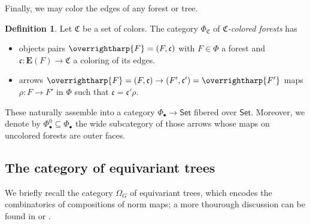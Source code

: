 \documentclass[a4paper,10pt
,draft
]{article}%
\numberwithin{equation}{section}
\numberwithin{figure}{section}
\theoremstyle{definition} %
\newtheorem{definition}[equation]{Definition}%
\newcommand{\vect}[1]{\text{\overrightharp{\ensuremath{#1}}}}
\newcommand{\Set}{\ensuremath{\mathsf{Set}}}
\newcommand{\1}{\ensuremath{\mathbbm 1}}%
\begin{document}
Finally, we may color the edges of any forest or tree.
\begin{definition}
      \label{CFOREST_DEF}
      Let $\mathfrak C$ be a set of colors.
      The category $\Phi_{\mathfrak C}$ of \textit{$\mathfrak C$-colored forests} has
      \begin{itemize}
      \item objects pairs $\vect F = (F, \mathfrak c)$ with
            $F \in \Phi$ a forest and
            $\mathfrak c \colon \boldsymbol{E}(F) \to \mathfrak C$ a coloring of its edges.
      \item arrows $\vect F = (F, \mathfrak c) \to (F', \mathfrak c') = \vect{F'}$ maps
            $\rho\colon F \to F'$ in $\Phi$ such that $\mathfrak c = \mathfrak c' \rho$.
      \end{itemize}      

      These naturally assemble into a category $\Phi_\bullet \to \Set$ fibered over $\Set$.
      Moreover, we denote by
      $\Phi_\bullet^0 \subseteq \Phi_\bullet$
      the wide subcategory of those arrows whose maps on uncolored forests are outer faces.
\end{definition}

\subsection{The category of equivariant trees}

We briefly recall the category $\Omega_G$ of equivariant trees, which encodes the combinatorics of compositions of norm maps;
a more thourough discussion can be found in \cite{Per18} or \cite[\S 2]{BP_edss}.
\end{document}
